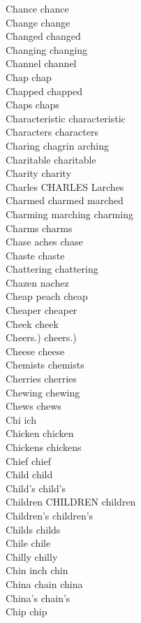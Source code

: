 Chance chance\\
Change change\\
Changed changed\\
Changing changing\\
Channel channel\\
Chap chap\\
Chapped chapped\\
Chaps chaps\\
Characteristic characteristic\\
Characters characters\\
Charing chagrin arching\\
Charitable charitable\\
Charity charity\\
Charles CHARLES Larches\\
Charmed charmed marched\\
Charming marching charming\\
Charms charms\\
Chase aches chase\\
Chaste chaste\\
Chattering chattering\\
Chazen nachez\\
Cheap peach cheap\\
Cheaper cheaper\\
Cheek cheek\\
Cheers.) cheers.)\\
Cheese cheese\\
Chemists chemists\\
Cherries cherries\\
Chewing chewing\\
Chews chews\\
Chi ich\\
Chicken chicken\\
Chickens chickens\\
Chief chief\\
Child child\\
Child's child's\\
Children CHILDREN children\\
Children's children's\\
Childs childs\\
Chile chile\\
Chilly chilly\\
Chin inch chin\\
China chain china\\
China's chain's\\
Chip chip\\
